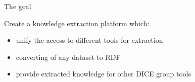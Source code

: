 \begin{frame}{The goal}

Create a knowledge extraction platform which:

\begin{itemize}
	\item unify the access to different tools for extraction 
	\item converting of any dataset to RDF
	\item provide extracted knowledge for other DICE group tools
\end{itemize}

\end{frame}